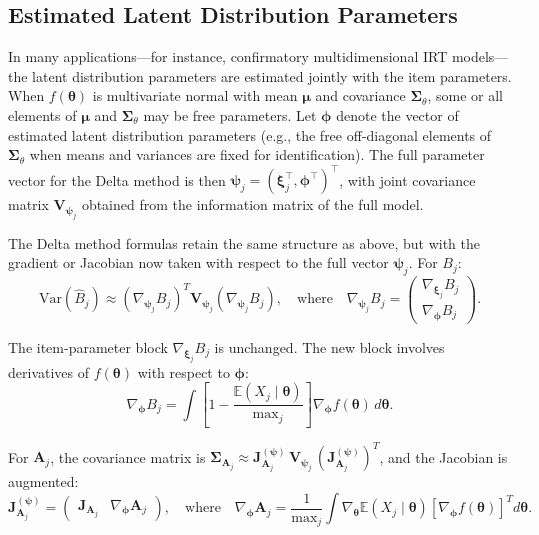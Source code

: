 \documentclass[man, 12pt, floatsintext]{apa7}
\begin{document}
\subsection{Estimated Latent Distribution Parameters}
In many applications—for instance, confirmatory multidimensional IRT models—the latent distribution parameters are estimated jointly with the item parameters. When $f(\boldsymbol{\theta})$ is multivariate normal with mean $\boldsymbol{\mu}$ and covariance $\boldsymbol{\Sigma}_\theta$, some or all elements of $\boldsymbol{\mu}$ and $\boldsymbol{\Sigma}_\theta$ may be free parameters. Let $\boldsymbol{\phi}$ denote the vector of estimated latent distribution parameters (e.g., the free off-diagonal elements of $\boldsymbol{\Sigma}_\theta$ when means and variances are fixed for identification). The full parameter vector for the Delta method is then $\boldsymbol{\psi}_j = (\boldsymbol{\xi}_j^\top, \boldsymbol{\phi}^\top)^\top$, with joint covariance matrix $\mathbf{V}_{\boldsymbol{\psi}_j}$ obtained from the information matrix of the full model.

The Delta method formulas retain the same structure as above, but with the gradient or Jacobian now taken with respect to the full vector $\boldsymbol{\psi}_j$. For $B_j$:
$$\text{Var}(\hat{B}_j) \approx \left(\nabla_{\boldsymbol{\psi}_j} B_j\right)^T \mathbf{V}_{\boldsymbol{\psi}_j} \left(\nabla_{\boldsymbol{\psi}_j} B_j\right), \quad \text{where}\quad \nabla_{\boldsymbol{\psi}_j} B_j = \begin{pmatrix} \nabla_{\boldsymbol{\xi}_j} B_j \\ \nabla_{\boldsymbol{\phi}} B_j \end{pmatrix}.$$

The item-parameter block $\nabla_{\boldsymbol{\xi}_j} B_j$ is unchanged. The new block involves derivatives of $f(\boldsymbol{\theta})$ with respect to $\boldsymbol{\phi}$:
$$\nabla_{\boldsymbol{\phi}} B_j = \int \left[1 - \frac{\mathbb{E}(X_j \mid \boldsymbol{\theta})}{\mathrm{max}_j}\right] \nabla_{\boldsymbol{\phi}} f(\boldsymbol{\theta})\, d\boldsymbol{\theta}.$$

For $\mathbf{A}_j$, the covariance matrix is $\mathbf{\Sigma}_{\mathbf{A}_j} \approx \mathbf{J}_{\mathbf{A}_j}^{(\boldsymbol{\psi})}\, \mathbf{V}_{\boldsymbol{\psi}_j}\, (\mathbf{J}_{\mathbf{A}_j}^{(\boldsymbol{\psi})})^T$, and the Jacobian is augmented:
$$\mathbf{J}_{\mathbf{A}_j}^{(\boldsymbol{\psi})} = \begin{pmatrix} \mathbf{J}_{\mathbf{A}_j} & \nabla_{\boldsymbol{\phi}} \mathbf{A}_j \end{pmatrix}, \quad \text{where}\quad \nabla_{\boldsymbol{\phi}} \mathbf{A}_j = \frac{1}{\mathrm{max}_j}\int \nabla_{\boldsymbol{\theta}}\mathbb{E}(X_j \mid \boldsymbol{\theta})\left[\nabla_{\boldsymbol{\phi}} f(\boldsymbol{\theta})\right]^T d\boldsymbol{\theta}.$$
\end{document}
